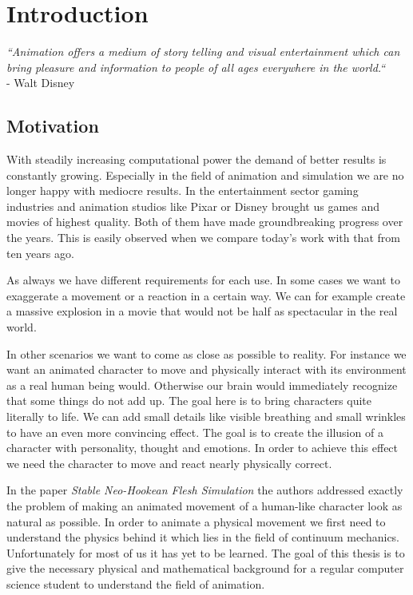 \chapter{Introduction}
\textit{``Animation offers a medium of story telling and visual entertainment which can bring pleasure and information to people of all ages everywhere in the world.``} \\
- Walt Disney


\section{Motivation}
With steadily increasing computational power the demand of better results is constantly growing. Especially in the field of animation and simulation we are no longer happy with mediocre results. 
In the entertainment sector gaming industries and animation studios like Pixar\textsuperscript{\textcopyright} or Disney\textsuperscript{\textcopyright} brought us games and movies of highest quality. Both of them have made groundbreaking progress over the years. This is easily observed when we compare today's work with that from ten years ago. 

As always we have different requirements for each use.
In some cases we want to exaggerate a movement or a reaction in a certain way. We can for example create a massive explosion in a movie that would not be half as spectacular in the real world. 

In other scenarios we want to come as close as possible to reality. For instance we want an animated character to move and physically interact with its environment as a real human being would. Otherwise our brain would immediately recognize that some things do not add up.
The goal here is to bring characters quite literally to life. We can add small details like visible breathing and small wrinkles to have an even more convincing effect. The goal is to create the illusion of a character with personality, thought and emotions. In order to achieve this effect we need the character to move and react nearly physically correct. 

In the paper \textit{Stable Neo-Hookean Flesh Simulation} \cite{Smith:2018:SNF:3191713.3180491} the authors addressed exactly the problem of making an animated movement of a human-like character look as natural as possible. In order to animate a physical movement we first need to understand the physics behind it which lies in the field of continuum mechanics. Unfortunately for most of us it has yet to be learned. The goal of this thesis is to give the necessary physical and mathematical background for a regular computer science student to understand the field of animation.


